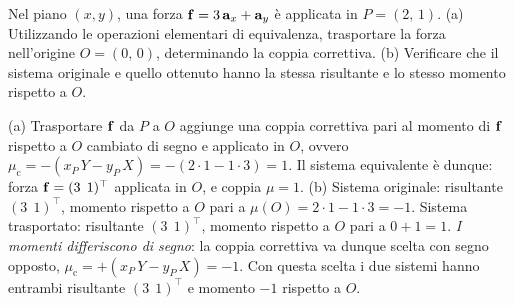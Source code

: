 \begin{esercizio}
	\label{ex:C02_trasporto}
	
	Nel piano $(x,y)$, una forza $\mathbf{f} = 3\,\mathbf{a}_x + \mathbf{a}_y$ è applicata in $P = (2,\,1)$.
	(a) Utilizzando le operazioni elementari di equivalenza, trasportare la forza nell'origine $O = (0,\,0)$, determinando la coppia correttiva.
	(b) Verificare che il sistema originale e quello ottenuto hanno la stessa risultante e lo stesso momento rispetto a $O$.
	
	\risultato (a) Trasportare $\mathbf{f}$ da $P$ a $O$ aggiunge una coppia correttiva pari al momento di $\mathbf{f}$ rispetto a $O$ cambiato di segno e applicato in $O$, ovvero $\mu_\mathrm{c} = -(x_P\,Y - y_P\,X) = -(2 \cdot 1 - 1 \cdot 3) = 1$. Il sistema equivalente è dunque: forza $\mathbf{f} = (3\;\,1)^\top$ applicata in $O$, e coppia $\mu = 1$. (b) Sistema originale: risultante $(3\;\,1)^\top$, momento rispetto a $O$ pari a $\mu(O) = 2 \cdot 1 - 1 \cdot 3 = -1$. Sistema trasportato: risultante $(3\;\,1)^\top$, momento rispetto a $O$ pari a $0 + 1 = 1$. \emph{I momenti differiscono di segno}: la coppia correttiva va dunque scelta con segno opposto, $\mu_\mathrm{c} = +(x_P\,Y - y_P\,X) = -1$. Con questa scelta i due sistemi hanno entrambi risultante $(3\;\,1)^\top$ e momento $-1$ rispetto a $O$.
	
\end{esercizio}

	
